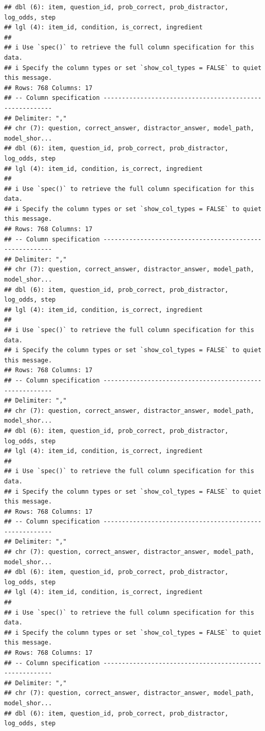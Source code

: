 \documentclass[
]{article}
\begin{document}
\begin{verbatim}
## dbl (6): item, question_id, prob_correct, prob_distractor, log_odds, step
## lgl (4): item_id, condition, is_correct, ingredient
## 
## i Use `spec()` to retrieve the full column specification for this data.
## i Specify the column types or set `show_col_types = FALSE` to quiet this message.
## Rows: 768 Columns: 17
## -- Column specification --------------------------------------------------------
## Delimiter: ","
## chr (7): question, correct_answer, distractor_answer, model_path, model_shor...
## dbl (6): item, question_id, prob_correct, prob_distractor, log_odds, step
## lgl (4): item_id, condition, is_correct, ingredient
## 
## i Use `spec()` to retrieve the full column specification for this data.
## i Specify the column types or set `show_col_types = FALSE` to quiet this message.
## Rows: 768 Columns: 17
## -- Column specification --------------------------------------------------------
## Delimiter: ","
## chr (7): question, correct_answer, distractor_answer, model_path, model_shor...
## dbl (6): item, question_id, prob_correct, prob_distractor, log_odds, step
## lgl (4): item_id, condition, is_correct, ingredient
## 
## i Use `spec()` to retrieve the full column specification for this data.
## i Specify the column types or set `show_col_types = FALSE` to quiet this message.
## Rows: 768 Columns: 17
## -- Column specification --------------------------------------------------------
## Delimiter: ","
## chr (7): question, correct_answer, distractor_answer, model_path, model_shor...
## dbl (6): item, question_id, prob_correct, prob_distractor, log_odds, step
## lgl (4): item_id, condition, is_correct, ingredient
## 
## i Use `spec()` to retrieve the full column specification for this data.
## i Specify the column types or set `show_col_types = FALSE` to quiet this message.
## Rows: 768 Columns: 17
## -- Column specification --------------------------------------------------------
## Delimiter: ","
## chr (7): question, correct_answer, distractor_answer, model_path, model_shor...
## dbl (6): item, question_id, prob_correct, prob_distractor, log_odds, step
## lgl (4): item_id, condition, is_correct, ingredient
## 
## i Use `spec()` to retrieve the full column specification for this data.
## i Specify the column types or set `show_col_types = FALSE` to quiet this message.
## Rows: 768 Columns: 17
## -- Column specification --------------------------------------------------------
## Delimiter: ","
## chr (7): question, correct_answer, distractor_answer, model_path, model_shor...
## dbl (6): item, question_id, prob_correct, prob_distractor, log_odds, step

\end{verbatim}
\end{document}
